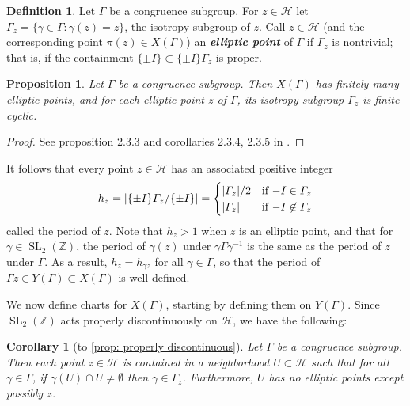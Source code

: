 \documentclass[10pt,leqno,twoside,b5paper]{article}
\theoremstyle{plain}
\newtheorem{proposition}[lem]{Proposition}
\newtheorem{corollary}[lem]{Corollary}
\theoremstyle{definition}
\newtheorem{definition/}[lem]{Definition}
\newenvironment{definition}
  {\renewcommand{\qedsymbol}{\textdagger}%
   \pushQED{\qed}\begin{definition/}}
  {\popQED\end{definition/}}
\numberwithin{equation}{section}
\numberwithin{lem}{section}
\newcommand{\textib}[1]{\textbf{\textit{#1\index{#1}}}} %
\DeclareMathOperator{\SL}{SL}
\newcommand{\slz}{\SL_2(\mathbb{Z})}
\begin{document}
\begin{definition}
    Let $\varGamma$ be a congruence subgroup. For $z\in\mathcal H$ let $\varGamma_z = \{\gamma\in\varGamma : \gamma(z) = z\}$, the isotropy subgroup of $z$. Call $z\in\mathcal H$ (and the corresponding point $\pi(z)\in X(\varGamma)$) an \textib{elliptic point} of $\varGamma$ if $\varGamma_z$ is nontrivial; that is, if the containment $\{\pm I\}\subset \{\pm I\}\varGamma_z$ is proper.
\end{definition}

\begin{proposition}\label{prop: cyclic isotropy subgp}
    Let $\varGamma$ be a congruence subgroup. Then $X(\varGamma)$ has finitely many elliptic points, and for each elliptic point $z$ of $\varGamma$, its isotropy subgroup $\varGamma_z$ is finite cyclic.
\end{proposition}
\begin{proof}
    See proposition 2.3.3 and corollaries 2.3.4, 2.3.5 in \cite{diamond}.
\end{proof}

It follows that every point $z\in\mathcal H$ has an associated positive integer
\[h_z = \abs{\{\pm I\}\varGamma_z/\{\pm I\}} = \begin{cases}
    \abs{\varGamma_z}/2 & \text{if $-I\in\varGamma_z$}\\
    \abs{\varGamma_z} & \text{if $-I\not\in\varGamma_z$}
\end{cases}\] called the period of $z$. Note that $h_z>1$ when $z$ is an elliptic point, and that for $\gamma\in\slz$, the period of $\gamma(z)$ under $\gamma\varGamma\gamma^{-1}$ is the same as the period of $z$ under $\varGamma$. As a result, $h_z = h_{\gamma z}$ for all $\gamma\in\varGamma$, so that the period of $\varGamma z\in Y(\varGamma)\subset X(\varGamma)$ is well defined.

We now define charts for $X(\varGamma)$, starting by defining them on $Y(\varGamma)$. Since $\slz$ acts properly discontinuously on $\mathcal H$, we have the following:

\begin{corollary}[to \cref{prop: properly discontinuous}]
    Let $\varGamma$ be a congruence subgroup. Then each point $z\in\mathcal H$ is contained in a neighborhood $U\subset \mathcal H$ such that for all $\gamma\in\varGamma$, if $\gamma(U)\cap U \neq \emptyset$ then $\gamma\in\varGamma_z$. Furthermore, $U$ has no elliptic points except possibly $z$.
\end{corollary}
\end{document}
